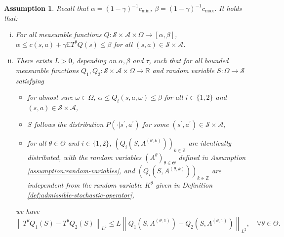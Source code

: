 \documentclass[11pt]{article}
\numberwithin{equation}{section}
\newtheorem{assumption}{Assumption}
\theoremstyle{definition}
\theoremstyle{remark}
\def\cA{\mathcal{A}}
\def\cS{\mathcal{S}}
\def\R{{\mathbb R}}
\def\Z{{\mathbb{Z}}}
\begin{document}
\begin{assumption}
    \label{assumption:lipschitz-condition-l2-stochastic-operator}
    Recall that $\alpha =  (1 - \gamma)^{-1}c_{\min}$, $ \beta =  (1 - \gamma)^{-1} c_{\max}$.  It holds that:
    \begin{enumerate}[(i)]
        \item\label{item:boundedness} 
        For all measurable functions  
$Q: \mathcal S \times \mathcal A \times \Omega \rightarrow [\alpha, \beta]$, 
        $\alpha \le c(s,a) + \gamma\mathbb E T^\theta Q(s) \le \beta $ for all $(s,a) \in \mathcal S \times \mathcal A$.
        \item\label{item:lipschitz-property} There exists   $L> 0$, depending on $\alpha,\beta$ and $\tau$, such that for all 
            bounded measurable functions
             $Q_1, Q_2 : \mathcal S \times \mathcal A \times \Omega \rightarrow \R$
         and 
            random variable
         $S:\Omega\to \cS$                  satisfying 
         \begin{itemize}
             \item 
             for almost sure $\omega\in \Omega$,
                  $\alpha \leq Q_i(s,a, \omega)  \leq \beta$ for all 
                  $i\in \{1,2\}$ and $(s,a) \in \cS \times \cA$,
            \item $S$ follows the distribution  $P(\cdot | s^\prime, a^\prime)$
        for some   $(s^\prime, a^\prime) \in \mathcal S \times \mathcal A$,   
                \item  
for all $\theta \in \Theta$ and $i\in \{1,2\}$, $(Q_i(S,A^{(\theta,k)}))_{k \in \Z}$ are identically distributed,     
                with the random variables $(A^\theta)_{\theta\in \Theta}$ defined in Assumption \ref{assumption:random-variables}, 
              and   $\left(Q_i(S,A^{(\theta,k)})\right)_{ k \in \Z}$ are independent from  the random variable $K^\theta$ 
              given in Definition \ref{def:admissible-stochastic-operator},
         \end{itemize}
we have  
              \begin{equation}
                  \label{eq:lipschitz-condition-l2-stochastic-operator}
                  \left\| T^\theta Q_1(S) - T^\theta Q_2(S) \right\|_{L^2} \leq  L \left\|Q_1\left(S,A^{(\theta, 1)}\right) - Q_2\left(S,A^{(\theta,1)}\right) \right\|_{L^2},
                  \quad \forall 
                  \theta \in \Theta.
              \end{equation}
    \end{enumerate}
\end{assumption}
\end{document}
